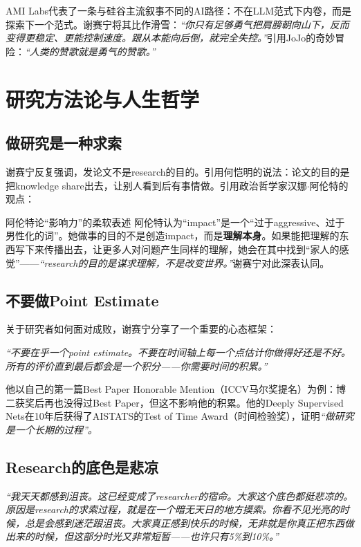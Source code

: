 \documentclass[a4paper]{article}
\begin{document}
AMI Labs代表了一条与硅谷主流叙事不同的AI路径：不在LLM范式下内卷，而是探索下一个范式。谢赛宁将其比作滑雪：\textit{``你只有足够勇气把肩膀朝向山下，反而变得更稳定、更能控制速度。跟从本能向后倒，就完全失控。''}引用JoJo的奇妙冒险：\textit{``人类的赞歌就是勇气的赞歌。''}

\section{研究方法论与人生哲学}

\subsection{做研究是一种求索}

谢赛宁反复强调，发论文不是research的目的。引用何恺明的说法：论文的目的是把knowledge share出去，让别人看到后有事情做。引用政治哲学家汉娜$\cdot$阿伦特的观点：

\begin{importantbox}{阿伦特论``影响力''的柔软表述}
阿伦特认为``impact''是一个``过于aggressive、过于男性化的词''。她做事的目的不是创造impact，而是\textbf{理解本身}。如果能把理解的东西写下来传播出去，让更多人对问题产生同样的理解，她会在其中找到``家人的感觉''——\textit{``research的目的是谋求理解，不是改变世界。''}谢赛宁对此深表认同。
\end{importantbox}

\subsection{不要做Point Estimate}

关于研究者如何面对成败，谢赛宁分享了一个重要的心态框架：

\textit{``不要在乎一个point estimate。不要在时间轴上每一个点估计你做得好还是不好。所有的评价直到最后都会是一个积分——你需要时间的积累。''}

他以自己的第一篇Best Paper Honorable Mention（ICCV马尔奖提名）为例：博二获奖后再也没得过Best Paper，但这不影响他的积累。他的Deeply Supervised Nets在10年后获得了AISTATS的Test of Time Award（时间检验奖），证明\textit{``做研究是一个长期的过程''。}

\subsection{Research的底色是悲凉}

\textit{``我天天都感到沮丧。这已经变成了researcher的宿命。大家这个底色都挺悲凉的。原因是research的求索过程，就是在一个暗无天日的地方摸索。你看不见光亮的时候，总是会感到迷茫跟沮丧。大家真正感到快乐的时候，无非就是你真正把东西做出来的时候，但这部分时光又非常短暂——也许只有5\%到10\%。''}
\end{document}

